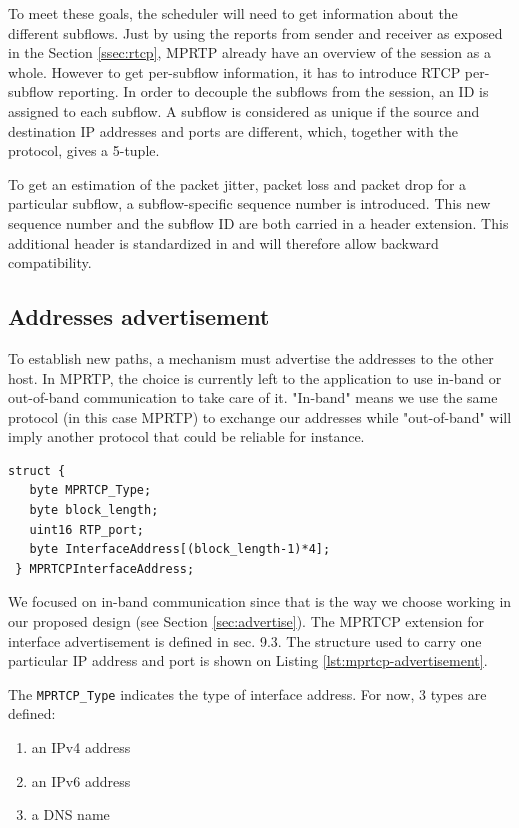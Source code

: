 To meet these goals, the scheduler will need to get information about the different subflows. Just by using the reports from sender and receiver as exposed in the Section \ref{ssec:rtcp}, MPRTP already have an overview of the session as a whole. However to get per-subflow information, it has to introduce RTCP per-subflow reporting. In order to decouple the subflows from the session, an ID is assigned to each subflow. A subflow is considered as unique if the source and destination IP addresses and ports are different, which, together with the protocol, gives a 5-tuple.

To get an estimation of the packet jitter, packet loss and packet drop for a particular subflow, a subflow-specific sequence number is introduced. This new sequence number and the subflow ID are both carried in a header extension. This additional header is standardized in \cite{RFC3550} and will therefore allow backward compatibility.

\subsection{Addresses advertisement}
\label{sec:mprtp-advertise}

To establish new paths, a mechanism must advertise the addresses to the other host. In MPRTP, the choice is currently \cite{singh-avtcore-mprtp} left to the application to use in-band or out-of-band communication to take care of it. "In-band" means we use the same protocol (in this case MPRTP) to exchange our addresses while "out-of-band" will imply another protocol that could be reliable for instance.

\begin{lstlisting}[caption=MPRTCP Interface Advertisement, label=lst:mprtcp-advertisement]
struct {
   byte MPRTCP_Type;
   byte block_length;
   uint16 RTP_port;
   byte InterfaceAddress[(block_length-1)*4];
 } MPRTCPInterfaceAddress;
\end{lstlisting}

We focused on in-band communication since that is the way we choose working in our proposed design (see Section \ref{sec:advertise}). The MPRTCP extension for interface advertisement is defined in \cite{singh-avtcore-mprtp} sec. 9.3. The structure used to carry one particular IP address and port is shown on Listing \ref{lst:mprtcp-advertisement}.

The \texttt{MPRTCP\_Type} indicates the type of interface address. For now, 3 types are defined: 
\begin{enumerate}
\item an IPv4 address
\item an IPv6 address
\item a DNS name
\end{enumerate}

